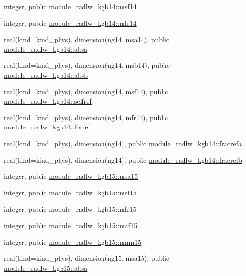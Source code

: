 \begin{DoxyCompactItemize}
\item 
integer, public \hyperlink{group__module__radlw__main_ga37c15d52e45cd6b36dc246a059b0c5ca}{module\+\_\+radlw\+\_\+kgb14\+::msf14}
\item 
integer, public \hyperlink{group__module__radlw__main_ga52354badbce95c005b19bd5a443fd488}{module\+\_\+radlw\+\_\+kgb14\+::mfr14}
\item 
real(kind=kind\+\_\+phys), dimension(ng14, msa14), public \hyperlink{group__module__radlw__main_gab57cb029ede27280bc99641f39ab3a81}{module\+\_\+radlw\+\_\+kgb14\+::absa}
\item 
real(kind=kind\+\_\+phys), dimension(ng14, msb14), public \hyperlink{group__module__radlw__main_gaa7a122319c49f3c1e8d51d21771cb63d}{module\+\_\+radlw\+\_\+kgb14\+::absb}
\item 
real(kind=kind\+\_\+phys), dimension(ng14, msf14), public \hyperlink{group__module__radlw__main_ga0e390a41b1c9e2ece765d65774060bca}{module\+\_\+radlw\+\_\+kgb14\+::selfref}
\item 
real(kind=kind\+\_\+phys), dimension(ng14, mfr14), public \hyperlink{group__module__radlw__main_ga8478067cb8a07a02b56c09fa3c73eb67}{module\+\_\+radlw\+\_\+kgb14\+::forref}
\item 
real(kind=kind\+\_\+phys), dimension(ng14), public \hyperlink{group__module__radlw__main_gae1e7065b9ea30b36a3665ad594545e9b}{module\+\_\+radlw\+\_\+kgb14\+::fracrefa}
\item 
real(kind=kind\+\_\+phys), dimension(ng14), public \hyperlink{group__module__radlw__main_ga13a211bf8a903d0720fa72ac90e4fc3f}{module\+\_\+radlw\+\_\+kgb14\+::fracrefb}
\item 
integer, public \hyperlink{namespacemodule__radlw__kgb15_abb9e98034166a07a6e349631d7fbb2a3}{module\+\_\+radlw\+\_\+kgb15\+::msa15}
\item 
integer, public \hyperlink{group__module__radlw__main_gae1b588ee60974c2d451c89f842601e07}{module\+\_\+radlw\+\_\+kgb15\+::msf15}
\item 
integer, public \hyperlink{group__module__radlw__main_gad4d78009d0c7ffa27dbb228e68307675}{module\+\_\+radlw\+\_\+kgb15\+::mfr15}
\item 
integer, public \hyperlink{group__module__radlw__main_ga482858cf08fb1a14117dfbaa6a57fe8c}{module\+\_\+radlw\+\_\+kgb15\+::maf15}
\item 
integer, public \hyperlink{group__module__radlw__main_ga8ab45999cfc7b9db0f3d3b61ccf803e8}{module\+\_\+radlw\+\_\+kgb15\+::mmn15}
\item 
real(kind=kind\+\_\+phys), dimension(ng15, msa15), public \hyperlink{group__module__radlw__main_gaa6412ac501e2afed3d1b64b0cdcdab9e}{module\+\_\+radlw\+\_\+kgb15\+::absa}

\end{DoxyCompactItemize}
